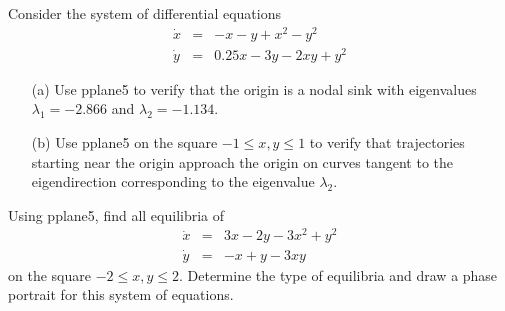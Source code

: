 \documentclass{ximera}
\begin{document}
\begin{exercise} \label{c8.2.11}
Consider the system of differential equations 
\begin{equation*}
\begin{array}{rcl}
\dot{x} & = & -x - y + x^2 - y^2\\
\dot{y} & = & 0.25x - 3y - 2xy + y^2
\end{array}
\end{equation*}
\begin{itemize}
\item[(a)] Use {\sf pplane5} to verify that the origin is a nodal
sink with 
eigenvalues $\lambda_1=-2.866$ and $\lambda_2=-1.134$.
\item[(b)] Use {\sf pplane5} on the square $-1\leq x,y \leq 1$ to 
verify that trajectories starting near the origin approach the 
origin on curves tangent to the eigendirection 
corresponding to the eigenvalue $\lambda_2$.
\end{itemize}
\end{exercise}

\begin{exercise} \label{c8.2.12}
Using {\sf pplane5}, find all equilibria of 
\begin{equation*}
\begin{array}{rcl}
\dot{x} & = & 3x-2y-3x^2+y^2 \\
\dot{y} & = & -x+y-3xy
\end{array}
\end{equation*}
on the square $-2\leq x,y \leq 2$.  Determine the type of 
equilibria and draw a phase portrait for this system of equations. 
\end{exercise}
\end{document}
